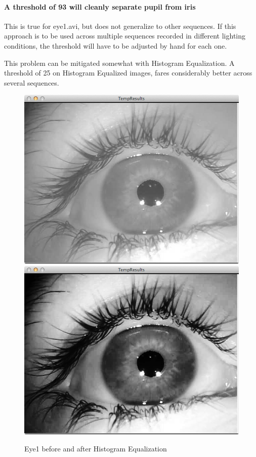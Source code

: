 \documentclass[a4paper,11pt]{article}
\begin{document}
\paragraph{A threshold of 93 will cleanly separate pupil from iris}
This is true for eye1.avi, but does not generalize to other sequences. If this approach is to be used across multiple sequences recorded in different lighting conditions, the threshold will have to be adjusted by hand for each one.

This problem can be mitigated somewhat with Histogram Equalization. A threshold of 25 on Histogram Equalized images, fares considerably better across several sequences.

\begin{figure}[ht]
  \centering
  \includegraphics[scale=0.2]{eye1}
  \includegraphics[scale=0.2]{eye1_hist_eq}
  \caption{Eye1 before and after Histogram Equalization}
  \label{fig:eye1_hist_eq}
\end{figure}
\end{document}
